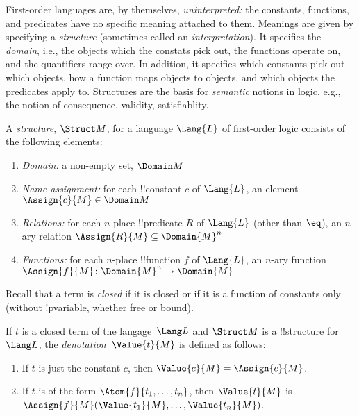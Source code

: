 \documentclass[../../include/open-logic-section]{subfiles}
\begin{document}

\begin{explain}
First-order languages are, by themselves, \emph{uninterpreted:} the
constants, functions, and predicates have no specific meaning attached
to them.  Meanings are given by specifying a \emph{structure}
(sometimes called an \emph{interpretation}).  It specifies the
\emph{domain}, i.e., the objects which the constats pick out, the
functions operate on, and the quantifiers range over. In addition, it
specifies which constants pick out which objects, how a function maps
objects to objects, and which objects the predicates apply to.
Structures are the basis for \emph{semantic} notions in logic, e.g.,
the notion of consequence, validity, satisfiablity.
\end{explain}

\begin{defn}[Structure]
A \emph{structure}, $\Struct M$, for a language $\Lang{L}$ of
first-order logic consists of the following elements:
\begin{enumerate}
\item \emph{Domain:} a non-empty set, $\Domain M$ 
\item \emph{Name assignment:} for each !!{constant} $c$ of
  $\Lang{L}$, an element $\Assign{c}{M} \in \Domain M$
\item \emph{Relations:} for each $n$-place !!{predicate} $R$ of
  $\Lang{L}$ (other than $\eq$), an $n$-ary relation $\Assign{R}{M}
  \subseteq \Domain{M}^n$
\item \emph{Functions:} for each $n$-place !!{function} $f$ of
  $\Lang{L}$, an $n$-ary function $\Assign{f}{M} \colon
  \Domain{M}^n \to \Domain{M}$
  
\end{enumerate}
\end{defn}

\begin{explain}
Recall that a term is \emph{closed} if it is closed or if it is a
function of constants only (without !p{variable}, whether free or bound).
\end{explain}

\begin{defn}
If $t$ is a closed term of the langage~$\Lang L$ and $\Struct M$ is a
!!{structure} for~$\Lang L$, the \emph{denotation}~$\Value{t}{M}$ is
defined as follows:
\begin{enumerate}
\item If $t$ is just the constant $c$, then $\Value{c}{M} = \Assign{c}{M}$.
\item If $t$ is of the form $\Atom{f}{t_1, \ldots, t_n}$, then
  $\Value{t}{M}$ is $\Assign{f}{M}(\Value{t_1}{M}, \ldots,
  \Value{t_n}{M})$.
\end{enumerate}
\end{defn}
\end{document}
